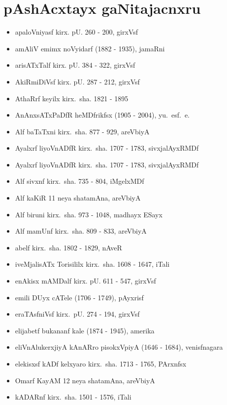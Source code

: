 \newpage
\section*{pAshAcxtayx gaNitajacnxru}

{\renewcommand\labelitemi{}
\begin{itemize}
\item apaloVniyasf kirx. pU. {\rm 260 - 200}, girxVsf
\item amAliV emimx noVyidarf {\rm (1882 - 1935)}, jamaRni
\item arisATxTalf kirx. pU. {\rm 384 - 322}, girxVsf
\item AkiRmiDiVsf kirx. pU. {\rm 287 - 212}, girxVsf
\item AthaRrf keyilx kirx.~sha. {\rm 1821 - 1895}
\item AnAnxsATxPaDfR heMDfrikfsx {\rm (1905 - 2004)}, yu.~esf.~e.
\item Alf baTaTxni kirx.~sha. {\rm 877 - 929}, areVbiyA
\item Ayalxrf liyoVnADfR kirx.~sha. {\rm 1707 - 1783}, sivxjalAyxRMDf
\item Ayalxrf liyoVnADfR kirx.~sha. {\rm 1707 - 1783}, sivxjalAyxRMDf
\item Alf sivxnf kirx.~sha. {\rm 735 - 804}, iMgelxMDf
\item Alf kaKiR {\rm 11} neya shatamAna, areVbiyA
\item Alf biruni kirx.~sha. {\rm 973 - 1048}, madhayx ESayx
\item Alf mamUnf kirx.~sha. {\rm 809 - 833}, areVbiyA
\item abelf kirx.~sha. {\rm 1802 - 1829}, nAveR
\item iveMjalisATx Torisililx kirx.~sha. {\rm 1608 - 1647}, iTali
\item enAkisx mAMDalf kirx. pU. {\rm 611 - 547}, girxVsf
\item emili DUyx cATele {\rm (1706 - 1749)}, pAyxrisf
\item eraTAsfniVsf kirx.~pU. {\rm 274 - 194}, girxVsf
\item elijabetf bukananf kale {\rm (1874 - 1945)}, amerika
\item eliVnAlukerxjiyA kAnARro pisokxVpiyA {\rm (1646 - 1684)}, venisfnagara
\item elekisxsf kADf kelxyaro kirx.~sha. {\rm 1713 - 1765}, PArxnfsx
\item Omarf KayAM {\rm 12} neya shatamAna, areVbiyA
\item kADARnf kirx.~sha. {\rm 1501 - 1576}, iTali

\end{itemize}}

